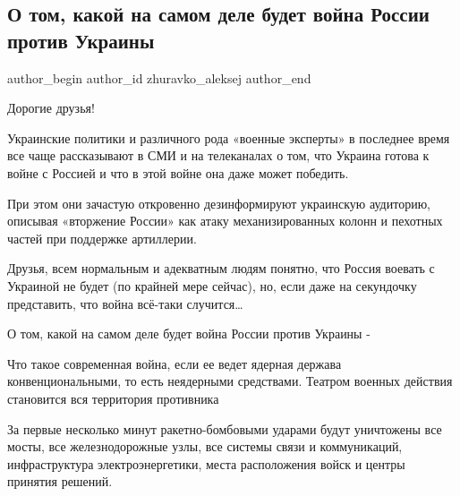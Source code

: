  
 
 
 
 
 
\subsection{О том, какой на самом деле будет война России против Украины}
\label{sec:02_12_2021.fb.zhuravko_aleksej.1.vojna_rossii_protiv_ukrainy}
 
\ifcmt
 author_begin
   author_id zhuravko_aleksej
 author_end
\fi

Дорогие друзья!

Украинские политики и различного рода «военные эксперты» в последнее время все
чаще рассказывают в СМИ и на телеканалах о том, что Украина готова к войне с
Россией и что в этой войне она даже может победить.

При этом они зачастую откровенно дезинформируют украинскую аудиторию, описывая
«вторжение России» как атаку механизированных колонн и пехотных частей при
поддержке артиллерии.


Друзья, всем нормальным и адекватным людям понятно, что Россия воевать с
Украиной не будет (по крайней мере сейчас), но, если даже на секундочку
представить, что война всё-таки случится…

О том, какой на самом деле будет война России против Украины - 

Что такое современная война, если ее ведет ядерная держава конвенциональными,
то есть неядерными средствами. Театром военных действия становится вся
территория противника

За первые несколько минут ракетно-бомбовыми ударами будут уничтожены все мосты,
все железнодорожные узлы, все системы связи и коммуникаций, инфраструктура
электроэнергетики, места расположения войск и центры принятия решений.

